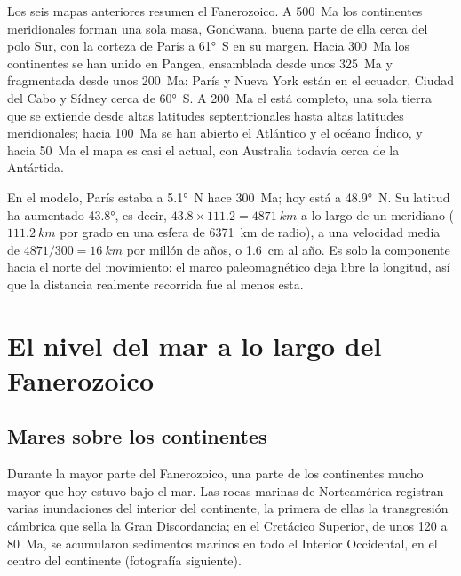 Los seis mapas anteriores resumen el Fanerozoico. A \qty{500}{Ma} los continentes meridionales forman
una sola masa, Gondwana, buena parte de ella cerca del polo Sur, con la corteza de París a \ang{61}~S en su
margen. Hacia \qty{300}{Ma} los continentes se han unido en Pangea, ensamblada desde unos
\qty{325}{Ma} y fragmentada desde unos \qty{200}{Ma}: París y Nueva York están en el ecuador, Ciudad del
Cabo y Sídney cerca de \ang{60}~S. A \qty{200}{Ma} el  está completo, una sola tierra
que se extiende desde altas latitudes septentrionales hasta altas latitudes meridionales; hacia \qty{100}{Ma} se han abierto el Atlántico y el océano Índico, y hacia
\qty{50}{Ma} el mapa es casi el actual, con Australia todavía cerca de la Antártida.

\begin{example}\label{ex:b2:phanerozoic-earth:paris}
En el modelo, París estaba a \ang{5.1}~N hace \qty{300}{Ma}; hoy está a \ang{48.9}~N. Su
latitud ha aumentado \ang{43.8}, es decir, $43.8 \times 111.2 = \qty{4871}{km}$ a lo largo de un meridiano
($\qty{111.2}{km}$ por grado en una esfera de \qty{6371}{km} de radio), a una velocidad media de
$4871/300 = \qty{16}{km}$ por millón de años, o \qty{1.6}{cm} al año. Es solo la componente hacia el norte
del movimiento: el marco paleomagnético deja libre la longitud, así que la distancia realmente
recorrida fue al menos esta.
\end{example}

\section{El nivel del mar a lo largo del Fanerozoico}\label{sec:b2:phanerozoic-earth:sealevel}

\subsection*{Mares sobre los continentes}

Durante la mayor parte del Fanerozoico, una parte de los continentes mucho mayor que hoy estuvo bajo el mar. Las
rocas marinas de Norteamérica registran varias inundaciones del interior del continente, la primera de
ellas la transgresión cámbrica que sella la Gran Discordancia; en el Cretácico Superior, de
unos 120 a \qty{80}{Ma}, se acumularon sedimentos marinos en todo el Interior Occidental, en el centro
del continente (fotografía siguiente).

